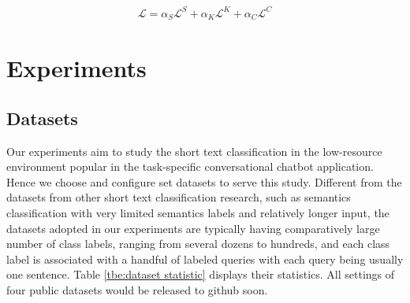 \documentclass[letterpaper]{article} %
\begin{document}
  \begin{align}
    \mathcal{L} = \alpha_S \mathcal{L}^S + \alpha_K \mathcal{L}^K + \alpha_C \mathcal{L}^C
    \label{eq:joint_SFC_loss}
  \end{align}

  \section{Experiments}
  \label{sec:exp}

  \subsection{Datasets}
  Our experiments aim to study the short text classification in the low-resource
  environment  popular  in  the  task-specific conversational chatbot application.
  Hence we choose and configure set datasets to serve this study. Different from
  the  datasets from other short text classification research, such as semantics
  classification  with  very  limited  semantics labels and relatively longer
  input,   the   datasets  adopted  in  our  experiments  are  typically  having
  comparatively  large  number  of  class labels, ranging from several dozens to
  hundreds,  and  each  class  label  is  associated  with  a handful of labeled
  queries with each  query  being usually  one  sentence. Table \ref{tbe:dataset
  statistic} displays their statistics.  All settings of four public datasets would 
  be released to github soon.
\end{document}
